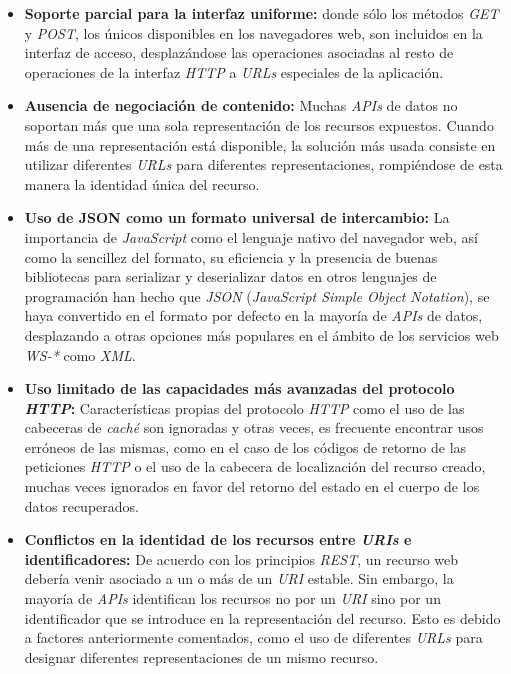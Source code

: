 \begin{itemize}

\item \textbf{Soporte parcial para la interfaz uniforme:} donde s\'olo los m\'etodos \textit{GET} y \textit{POST}, los \'unicos disponibles en los navegadores web, son incluidos en la interfaz de acceso, desplaz\'andose las operaciones asociadas al resto de operaciones de la interfaz \textit{HTTP} a \textit{URLs} especiales de la aplicaci\'on.

\item \textbf{Ausencia de negociaci\'on de contenido:} Muchas \textit{APIs} de datos no soportan m\'as que una sola representaci\'on de los recursos expuestos. Cuando m\'as de una representaci\'on est\'a disponible, la soluci\'on m\'as usada consiste en utilizar diferentes \textit{URLs} para diferentes representaciones, rompi\'endose de esta manera la identidad \'unica del recurso.

\item \textbf{Uso de JSON como un formato universal de intercambio:} La importancia de \textit{JavaScript} como el lenguaje nativo del navegador web, as\'i como la sencillez del formato, su eficiencia y la presencia de buenas bibliotecas para serializar y deserializar datos en otros lenguajes de programaci\'on han hecho que \textit{JSON} (\textit{JavaScript Simple Object Notation}), se haya convertido en el formato por defecto en la mayor\'ia de \textit{APIs} de datos, desplazando a otras opciones m\'as populares en el \'ambito de los servicios web \textit{WS-*} como \textit{XML}.

\item \textbf{Uso limitado de las capacidades m\'as avanzadas del protocolo \textit{HTTP}:} Caracter\'isticas propias del protocolo \textit{HTTP} como el uso de las cabeceras de \textit{cach\'e} son ignoradas y otras veces, es frecuente encontrar usos err\'oneos de las mismas, como en el caso de los c\'odigos de retorno de las peticiones \textit{HTTP} o el uso de la cabecera de localizaci\'on del recurso creado, muchas veces ignorados en favor del retorno del estado en el cuerpo de los datos recuperados.

\item \textbf{Conflictos en la identidad de los recursos entre \textit{URIs} e identificadores:} De acuerdo con los principios \textit{REST}, un recurso web deber\'ia venir asociado a un o m\'as de un \textit{URI} estable. Sin embargo, la mayor\'ia de \textit{APIs} identifican los recursos no por un \textit{URI} sino por un identificador que se introduce en la representaci\'on del recurso. Esto es debido a factores anteriormente comentados, como el uso de diferentes \textit{URLs} para designar diferentes representaciones de un mismo recurso.


\end{itemize}
